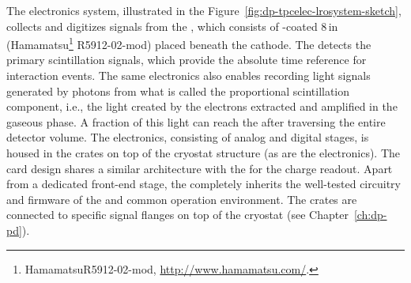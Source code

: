 The  electronics system, illustrated in the Figure~\ref{fig:dp-tpcelec-lrosystem-sketch},  collects and digitizes signals from the , which consists of -coated \num{8}\,in  (Hamamatsu\footnote{Hamamatsu\texttrademark R5912-02-mod, \url{http://www.hamamatsu.com/}.} R5912-02-mod) placed beneath the  cathode. The  detects the primary scintillation signals, which provide the absolute time reference for interaction events. The same electronics also enables recording light signals generated by photons from what is called the proportional scintillation component, i.e., the light created by the electrons extracted and amplified in the gaseous phase. A fraction of this light can reach the  after traversing the entire detector volume. The  electronics, consisting of analog and digital stages, is housed in the  crates on top of the cryostat structure (as are the  electronics). The   card design shares a similar architecture with the  for the charge readout. Apart from a dedicated front-end stage, the   completely inherits the well-tested circuitry and firmware of the   and common operation environment. The   crates are connected to specific  signal \fdth flanges on top of the cryostat (see Chapter~\ref{ch:dp-pd}).

